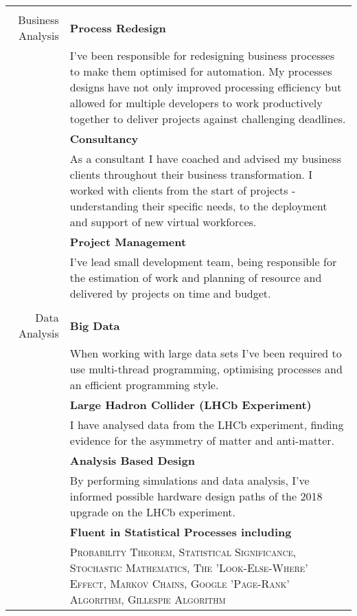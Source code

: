 \documentclass[a4paper,11pt]{article}
\begin{document}
\begin{tabular}{r|p{13cm}}
    \multicolumn{2}{c}{}\\
    Business Analysis
        & \textbf{Process Redesign}\\
        & \footnotesize{I've been responsible for redesigning business processes to make them optimised for automation. My processes designs have not only improved processing efficiency but allowed for multiple developers to work productively together to deliver projects against challenging deadlines.}\\
        & \textbf{Consultancy}\\
        & \footnotesize{As a consultant I have coached and advised my business clients throughout their business transformation. I worked with clients from the start of projects - understanding their specific needs, to the deployment and support of new virtual workforces.}\\
        & \textbf{Project Management} \\
        & \footnotesize{I've lead small development team, being responsible for the estimation of work and planning of resource and delivered by projects on time and budget.} \\   
    \multicolumn{2}{c}{}\\
    Data Analysis
        & \textbf{Big Data}\\
        & \footnotesize{When working with large data sets I've been required to use multi-thread programming, optimising processes and an efficient programming style.}\\
        & \textbf{Large Hadron Collider (LHCb Experiment)}\\
        & \footnotesize{I have analysed data from the LHCb experiment, finding evidence for the asymmetry of matter and anti-matter.} \\
        & \textbf{Analysis Based Design} \\
        & \footnotesize{By performing simulations and data analysis, I've informed possible hardware design paths of the 2018 upgrade on the LHCb experiment.} \\
        & \textbf{Fluent in Statistical Processes including} \\
        & \textsc{\footnotesize{Probability Theorem, Statistical Significance, Stochastic Mathematics, The 'Look-Else-Where' Effect, Markov Chains, Google 'Page-Rank' Algorithm, Gillespie Algorithm}} \\
\end{tabular}


\end{document}
